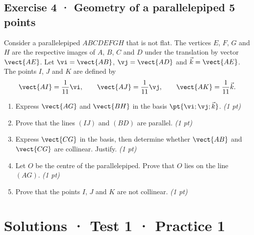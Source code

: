 \subsection*{Exercise 4 · Geometry of a parallelepiped \hfill 5 points}Consider a parallelepiped $ABCDEFGH$ that is not flat. The vertices $E$, $F$, $G$ and $H$ are the respective images of $A$, $B$, $C$ and $D$ under the translation by vector $\vect{AE}$.
Let $\vi=\vect{AB}$, $\vj=\vect{AD}$ and $\vec k=\vect{AE}$.
The points $I$, $J$ and $K$ are defined by
\[\vect{AI}=\frac1{11}\vi,\qquad\vect{AJ}=\frac1{11}\vj,\qquad\vect{AK}=\frac1{11}\vec k.\]

\begin{enumerate}

\item Express $\vect{AG}$ and $\vect{BH}$ in the basis $\pt{\vi;\vj;\vec k}$. \hfill\textit{(1 pt)}

\item Prove that the lines $(IJ)$ and $(BD)$ are parallel. \hfill\textit{(1 pt)}

\item Express $\vect{CG}$ in the basis, then determine whether $\vect{AB}$ and $\vect{CG}$ are collinear. Justify. \hfill\textit{(1 pt)}

\item Let $O$ be the centre of the parallelepiped. Prove that $O$ lies on the line $(AG)$. \hfill\textit{(1 pt)}

\item Prove that the points $I$, $J$ and $K$ are not collinear. \hfill\textit{(1 pt)}

\end{enumerate}

\ifmxteacher\mxnewpage

\section*{Solutions · Test 1 · Practice 1}\label{cor:1-1}

